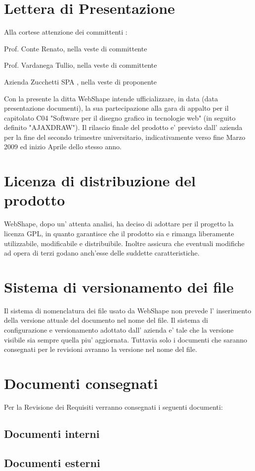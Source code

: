 \newpage

\section{Lettera di Presentazione}

Alla cortese attenzione dei committenti :
\begin{list}{-}{}
\item Prof. Conte Renato, nella veste di committente
\item Prof. Vardanega Tullio, nella veste di committente
\item Azienda Zucchetti SPA , nella veste di proponente
\end{list}

Con la presente la ditta WebShape intende ufficializzare, in data (data presentazione documenti), la sua partecipazione alla gara di appalto per il capitolato C04 "Software per il disegno grafico in tecnologie web" (in seguito definito "AJAXDRAW"). Il rilascio finale del prodotto e' previsto dall' azienda per la fine del secondo trimestre universitario, indicativamente verso fine Marzo 2009 ed inizio Aprile dello stesso anno. 

\section{Licenza di distribuzione del prodotto} 
WebShape, dopo un' attenta analisi, ha deciso di adottare per il progetto la licenza GPL, in quanto garantisce che il prodotto sia e rimanga liberamente utilizzabile, modificabile e distribuibile. Inoltre assicura che eventuali modifiche ad opera di terzi godano anch'esse delle suddette caratteristiche.

\section{Sistema di versionamento dei file} 
Il sistema di nomenclatura dei file usato da WebShape non prevede l' inserimento della versione attuale del documento nel nome del file. Il sistema di configurazione e versionamento adottato dall' azienda e' tale che la versione visibile sia sempre quella                   piu' aggiornata. Tuttavia solo i documenti che saranno consegnati per le revisioni avranno la versione nel nome del file. 

\section{Documenti consegnati}
Per la Revisione dei Requisiti verranno consegnati i seguenti documenti: 
\subsection{Documenti interni}
\subsection{Documenti esterni}


